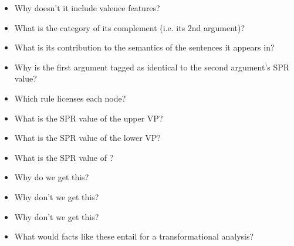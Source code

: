 \documentclass[a4paper,landscape,headrule,footrule,dvips]{foils}
\begin{document}
\begin{itemize}\addtolength{\itemsep}{-1ex}
\item Why doesn’t it include valence features?
\item What is the category of its complement (i.e. its 2nd argument)?
\item What is its contribution to the semantics of the sentences it 
appears in?
\item Why is the first argument tagged as identical to the second 
argument’s SPR value?
\end{itemize}

\begin{tree}
\end{tree}

\begin{itemize}
\item Which rule licenses each node?
\item What is the SPR value of the upper VP?
\item What is the SPR value of the  lower VP?
\item What is the SPR value of ?
\end{itemize}

\begin{itemize}
\item Why do we get this?
  \begin{exe}
    \ex {}
  \end{exe}
\item Why don't we get this?
 \begin{exe}
    \ex *
  \end{exe}
\item Why don’t we get this? 
\begin{exe}
    \ex *
  \end{exe}
\item What would facts like these entail for a transformational 
analysis?
\end{itemize}

\end{document}
